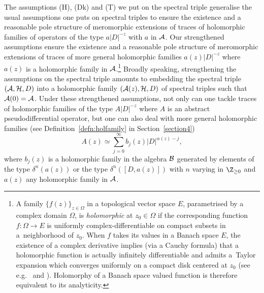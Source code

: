  The assumptions (H), (Dk) and (T) we put on the spectral triple generalise
the usual assumptions one puts on spectral triples to ensure the existence and a
reasonable pole structure of
meromorphic extensions of traces of holomorphic families of  operators of the
type $a \vert
D\vert^{-z}$ with $a$ in ${\cal A}$. Our strengthened assumptions ensure
the existence and a reasonable pole structure of meromorphic extensions of  traces of  more general holomorphic families
$a(z)   \vert D\vert^{-z}$ where $a(z)$ is a holomorphic family in ${\cal
  A}$.\footnote{\label{footnote:holfam}A family $\{f(z)\}_{z\in \Omega}$  in a topological vector space $E$,
 parametrised by a complex domain $\Omega$,  is {\it  holomorphic} at
$z_0\in \Omega$ if
the corresponding function $f:\Omega\to E$  is   uniformly
complex-dif\/ferentiable on compact subsets in a~neighborhood of $z_0$.  When $f$
takes its values in a Banach space $E$,    the existence of a complex
derivative  implies (via  a  Cauchy formula) that a holomorphic
function is actually inf\/initely dif\/ferentiable and admits a~Taylor expansion which converges uniformly  on a  compact disk centered at
  $z_0$ (see e.g.~\cite[Theorem~8.1.7]{Hig}   and \cite[Section~XV.5.1]{DS}).
   Holomorphy of a Banach space valued function is therefore equivalent to
   its analyticity.}  Broadly speaking, strengthening the assumptions on the spectral triple
amounts to embedding the spectral triple $\left({\cal A}, {\cal
    H}, D\right)$ into a holomorphic family $\left({\cal A}(z), {\cal
    H}, D\right)$ of spectral triples such that ${\cal A}(0)={\cal A}$.  Under these strengthened  assumptions,   not only can one  tackle
traces of holomorphic families of the type  $A
\vert D\vert^{-z}$ where $A$ is an abstract pseudodif\/ferential operator, but
one can also deal with
more general holomorphic families (see Def\/inition~\ref{defn:holfamily} in
Section~\ref{section4})
\[
A(z)\simeq\sum_{j=0}^\infty
b_j(z) \vert D\vert^{\alpha(z)-j},
\]
 where $b_j(z)$ is a holomorphic family in
the algebra ${\cal B}$  generated by  elements  of the type $\delta^n(a(z))$ or the type $ \delta^n\left([D,
  a(z)]\right)$ with $  n$ varying in $ \Z_{\geq 0}$ and  $a(z)$ any holomorphic family in ${\cal
  A} $.
